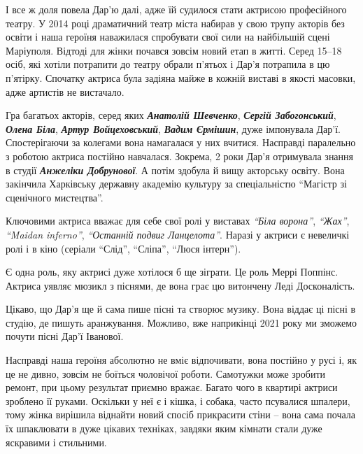 І все ж доля повела Дар'ю далі, адже їй судилося стати актрисою професійного
театру. У 2014 році драматичний театр міста набирав у свою трупу акторів без
освіти і наша героїня наважилася спробувати свої сили на найбільшій сцені
Маріуполя. Відтоді для жінки почався зовсім новий етап в житті. Серед 15–18
осіб, які хотіли потрапити до театру обрали п'ятьох і Дар'я потрапила в цю
п'ятірку. Спочатку актриса була задіяна майже в кожній виставі в якості
масовки, адже артистів не вистачало.


Гра багатьох акторів, серед яких \emph{\textbf{Анатолій Шевченко}}, \emph{\textbf{Сергій Забогонський}}, \emph{\textbf{Олена
Біла}}, \emph{\textbf{Артур Войцеховський}}, \emph{\textbf{Вадим Єрмішин}}, дуже імпонувала Дар'ї. Спостерігаючи
за колегами вона намагалася у них вчитися. Насправді паралельно з роботою
актриса постійно навчалася. Зокрема, 2 роки Дар'я отримувала знання в студії
\emph{\textbf{Анжеліки Добрунової}}. А потім здобула й вищу акторську освіту. Вона закінчила
Харківську державну академію культуру за спеціальністю \enquote{Магістр зі сценічного
мистецтва}. 

Ключовими актриса вважає для себе свої ролі у виставах \emph{\enquote{Біла ворона}}, \emph{\enquote{Жах}},
\emph{\enquote{Maidan inferno}}, \emph{\enquote{Останній подвиг Ланцелота}}. Наразі у актриси є невеличкі
ролі і в кіно (серіали \enquote{Слід}, \enquote{Сліпа}, \enquote{Люся інтерн}).

Є одна роль, яку актрисі дуже хотілося б  ще зіграти. Це роль Меррі Поппінс.
Актриса уявляє мюзикл з піснями, де вона грає цю витончену Леді Досконалість.

Цікаво, що Дар'я ще й сама пише пісні та створює музику. Вона віддає ці пісні в
студію, де пишуть аранжування. Можливо, вже наприкінці 2021 року ми зможемо
почути пісні Дар'ї Іванової.

Насправді наша героїня абсолютно не вміє відпочивати, вона постійно у русі і,
як це не дивно, зовсім не боїться чоловічої роботи. Самотужки може зробити
ремонт, при цьому результат приємно вражає. Багато чого в квартирі актриси
зроблено її руками. Оскільки у неї є і кішка, і собака, часто псувалися
шпалери, тому жінка вирішила віднайти новий спосіб прикрасити стіни – вона сама
почала їх шпаклювати в дуже цікавих техніках, завдяки яким кімнати стали дуже
яскравими і стильними.



